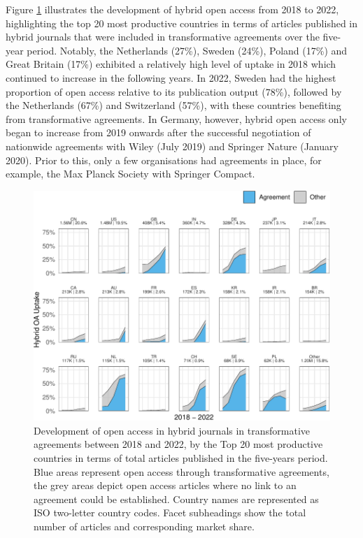 \documentclass[a4paper,man,floatsintext,longtable,noextraspace,12pt]{apa6}
\begin{document}
Figure \ref{fig:country_top_20_plot} illustrates the development of
hybrid open access from 2018 to 2022, highlighting the top 20 most
productive countries in terms of articles published in hybrid journals
that were included in transformative agreements over the five-year
period. Notably, the Netherlands (27\%), Sweden (24\%), Poland (17\%)
and Great Britain (17\%) exhibited a relatively high level of uptake in
2018 which continued to increase in the following years. In 2022, Sweden
had the highest proportion of open access relative to its publication
output (78\%), followed by the Netherlands (67\%) and Switzerland
(57\%), with these countries benefiting from transformative agreements.
In Germany, however, hybrid open access only began to increase from 2019
onwards after the successful negotiation of nationwide agreements with
Wiley (July 2019) and Springer Nature (January 2020). Prior to this,
only a few organisations had agreements in place, for example, the Max
Planck Society with Springer Compact.

\begin{figure}[ht!]

{\centering \includegraphics[width=0.99\linewidth,]{fig/country_top_20_plot-1} 

}

\caption{Development of open access in hybrid journals in transformative agreements between 2018 and 2022, by the Top 20 most productive countries in terms of total articles published in the five-years period. Blue areas represent open access through transformative agreements, the grey areas depict open access articles where no link to an agreement could be established. Country names are represented as ISO two-letter country codes. Facet subheadings show the total number of articles and corresponding market share.}\label{fig:country_top_20_plot}
\end{figure}
\end{document}
